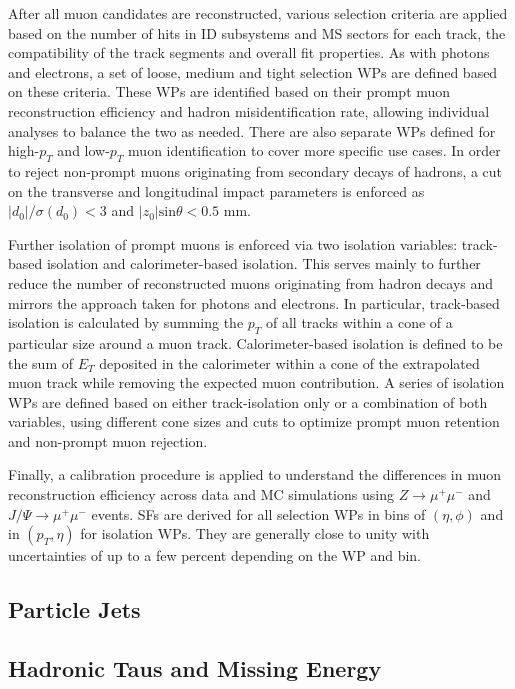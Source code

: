 After all muon candidates are reconstructed, various selection criteria are applied based on the number of hits in ID subsystems 
and MS sectors for each track, the compatibility of the track segments and overall fit properties. As with photons and electrons, 
a set of loose, medium and tight selection WPs are defined based on these criteria. These WPs are identified based on their prompt 
muon reconstruction efficiency and hadron misidentification rate, allowing individual analyses to balance the two as needed. There 
are also separate WPs defined for high-$p_T$ and low-$p_T$ muon identification to cover more specific use cases. In order to 
reject non-prompt muons originating from secondary decays of hadrons, a cut on the transverse and longitudinal impact parameters 
is enforced as $|d_0|/\sigma(d_0) < 3$ and $|z_0|\text{sin}\theta < 0.5$ mm. \par

Further isolation of prompt muons is enforced via two isolation variables: track-based isolation and calorimeter-based isolation. 
This serves mainly to further reduce the number of reconstructed muons originating from hadron decays and mirrors the approach 
taken for photons and electrons. In particular, track-based isolation is calculated by summing the $p_T$ of all tracks within a 
cone of a particular size around a muon track. Calorimeter-based isolation is defined to be the sum of $E_T$ deposited in the 
calorimeter within a cone of the extrapolated muon track while removing the expected muon contribution. A series of isolation WPs 
are defined based on either track-isolation only or a combination of both variables, using different cone sizes and cuts to 
optimize prompt muon retention and non-prompt muon rejection. \par

Finally, a calibration procedure is applied to understand the differences in muon reconstruction efficiency across data and MC 
simulations using $Z \rightarrow \mu^+\mu^-$ and $J/\Psi \rightarrow \mu^+\mu^-$ events. SFs are derived for all selection WPs 
in bins of $(\eta, \phi)$ and in $(p_T, \eta)$ for isolation WPs. They are generally close to unity with uncertainties of up to 
a few percent depending on the WP and bin. \par

\subsection{Particle Jets}

\subsection{Hadronic Taus and Missing Energy}